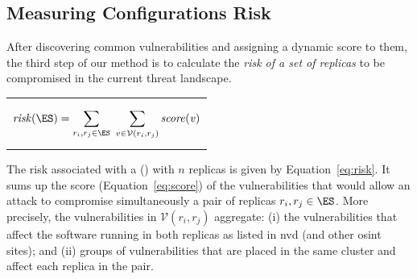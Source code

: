 \subsection{Measuring Configurations Risk}
\label{sec:risk}

After discovering common vulnerabilities and assigning a dynamic score to them, the third step of our method is to calculate the \emph{risk of a set of replicas} to be compromised in the current threat landscape.


\begin{table}[h]
\begin{center}
\begin{tabular}{ c }

\vbox{
\begin{equation}
\mathit{risk(\ES)}=\sum_{r_i,r_j \in \ES}^{} \hspace{1.2mm} \sum_{v \in \mathcal{V}(r_i,r_j)}^{}\mathit{score(v)}
\label{eq:risk}
\end{equation}
}
\\
\end{tabular}
\end{center}
\end{table}


The risk associated with a \configuration (\ES) with $n$ replicas is given by Equation~\ref{eq:risk}. 
It sums up the score (Equation~\ref{eq:score}) of the vulnerabilities that would allow an attack to compromise simultaneously a pair of replicas $r_i,r_j \in \ES$.
More precisely, the vulnerabilities in $\mathcal{V}(r_i,r_j)$ aggregate: (i) the vulnerabilities that affect the software running in both replicas as listed in \gls{nvd} (and other \gls{osint} sites); and (ii) groups of vulnerabilities that are placed in the same cluster and affect each replica in the pair. 



